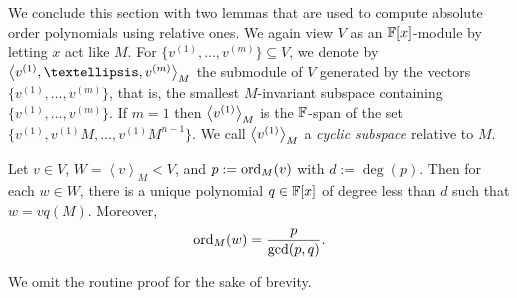 \smallskip
We conclude this section with two lemmas that are used to
compute absolute order polynomials using relative ones. We again
view $V$ as an $\mathbb{F}[x]$-module by letting $x$ act like $M$. For
$\{v^{(1)},\dots,v^{(m)}\} \subseteq V$, we denote by $\la
v^{(1)},\dots,v^{(m)}\ra_M$ the submodule of $V$ generated
by the vectors $\{v^{(1)},\dots,v^{(m)}\}$, that is, the smallest $M$-invariant
subspace containing $\{v^{(1)},\dots,v^{(m)}\}$. If $m=1$ then $\left<
v^{(1)}\right>_M$ is the $\mathbb{F}$-span of the set $\{v^{(1)},v^{(1)}M,\dots,
v^{(1)}M^{n-1}\}$. We call $\left< v^{(1)}\right>_M$ a \emph{cyclic
subspace} relative to $M$.

\begin{Lemm}
\label{ordpolcyclic}
Let $v\in V$, $W = \left< v \right>_M < V$, and
$p := \mathrm{ord}_M(v)$ with $d := \deg(p)$. 
Then for each $w \in W$, there is a unique polynomial
$q \in \mathbb{F}[x]$ of degree less than $d$ such that $w = vq(M)$.
Moreover,
\[ \mathrm{ord}_M(w) = \frac{p}{\gcd(p,q)}. \]
\end{Lemm}
\noindent We omit the routine proof for the sake of brevity. \proofend
%
%

%

